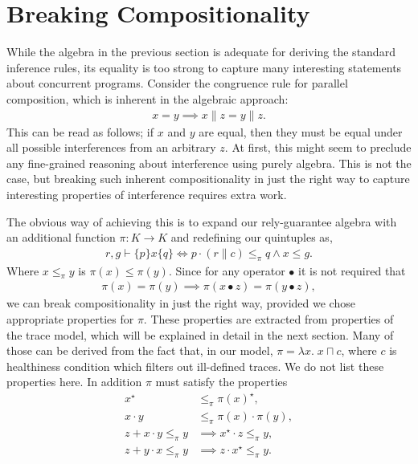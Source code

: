 \documentclass{llncs}
\begin{document}
\section{Breaking Compositionality}
\label{sec:INT}

While the algebra in the previous section is adequate for deriving the
standard inference rules, its equality is too strong to capture many
interesting statements about concurrent programs. Consider the
congruence rule for parallel composition, which is inherent in the
algebraic approach:
\begin{align*}
x = y \implies x\|z = y\|z.
\end{align*}
This can be read as follows; if $x$ and $y$ are equal, then they must
be equal under all possible interferences from an arbitrary $z$. At
first, this might seem to preclude any fine-grained reasoning about
interference using purely algebra. This is not the case, but breaking
such inherent compositionality in just the right way to capture
interesting properties of interference requires extra work.

The obvious way of achieving this is to expand our rely-guarantee
algebra with an additional function $\pi : K \to K$ and redefining our
quintuples as,
\begin{align*}
r, g \vdash \{p\} x \{q\} \iff p\cdot (r\|c) \le_\pi q \land x \le g.
\end{align*}
Where $x \le_\pi y$ is $\pi(x) \le \pi(y)$. Since for any operator
$\bullet$ it is not required that
\begin{align*}
\pi(x) = \pi(y) \implies \pi(x \bullet z) = \pi(y \bullet z),
\end{align*}
we can break compositionality in just the right way, provided we chose
appropriate properties for $\pi$. These properties are extracted from
properties of the trace model, which will be explained in detail in
the next section. Many of those can be derived from the fact that, in
our model, $\pi = \lambda x.\; x \sqcap c$, where $c$ is healthiness
condition which filters out ill-defined traces. We do not list these
properties here. In addition $\pi$ must satisfy the properties
\begin{align}
x^\star &\le_\pi \pi(x)^\star, \label{con1}\\
x\cdot y &\le_\pi \pi(x)\cdot \pi(y), \label{con2}\\
z + x\cdot y \le_\pi y &\implies x^\star\cdot z \le_\pi y\label{con3},\\
z + y\cdot x \le_\pi y &\implies z\cdot x^\star \le_\pi y\label{con4}.
\end{align}
\end{document}
